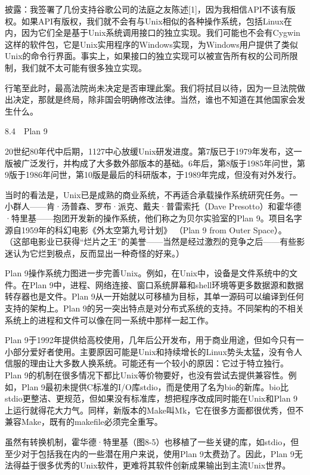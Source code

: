 \documentclass[a4paper,12pt,UTF8,twoside]{ctexbook}
\begin{document}
披露：我签署了几份支持谷歌公司的法庭之友陈述[1]，因为我相信API不该有版权。如果API有版权，我们就不会有与Unix相似的各种操作系统，包括Linux在内，因为它们全是基于Unix系统调用接口的独立实现。我们可能也不会有Cygwin这样的软件包，它是Unix实用程序的Windows实现，为Windows用户提供了类似Unix的命令行界面。事实上，如果接口的独立实现可以被宣告所有权的公司所限制，我们就不太可能有很多独立实现。

行笔至此时，最高法院尚未决定是否审理此案。我们将拭目以待，因为一旦法院做出决定，那就是终局，除非国会明确修改法律。当然，谁也不知道在其他国家会发生什么。





8.4　Plan 9


20世纪80年代中后期，1127中心放缓Unix研发进度。第7版已于1979年发布，这一版被广泛发行，并构成了大多数外部版本的基础。6年后，第8版于1985年问世，第9版于1986年问世，第10版是最后的科研版本，于1989年完成，但没有对外发行。

当时的看法是，Unix已是成熟的商业系统，不再适合承载操作系统研究任务。一小群人——肯·汤普森、罗布·派克、戴夫·普雷索托（Dave Presotto）和霍华德·特里基——抱团开发新的操作系统，他们称之为贝尔实验室的Plan 9。项目名字源自1959年的科幻电影《外太空第九号计划》 （Plan 9 from Outer Space）。 （这部电影业已获得“烂片之王”的美誉——当然是经过激烈的竞争之后——有些影迷认为它烂到极点，反而显出一种奇怪的好来。）

Plan 9操作系统力图进一步完善Unix。例如，在Unix中，设备是文件系统中的文件。在Plan 9中，进程、网络连接、窗口系统屏幕和shell环境等更多数据源和数据转存器也是文件。Plan 9从一开始就以可移植为目标，其单一源码可以编译到任何支持的架构上。Plan 9的另一突出特点是对分布式系统的支持。不同架构的不相关系统上的进程和文件可以像在同一系统中那样一起工作。

Plan 9于1992年提供给高校使用，几年后公开发布，用于商业用途，但如今只有一小部分爱好者使用。主要原因可能是Unix和持续增长的Linux势头太猛，没有令人信服的理由让大多数人换系统。可能还有一个较小的原因：它过于特立独行。Plan 9的机制在很多情况下都比Unix等价物要好，也没有尝试去提供兼容性。例如，Plan 9最初未提供C标准的I/O库stdio，而是使用了名为bio的新库。bio比stdio更整洁、更规范，但如果没有标准库，想把程序改成同时能在Unix和Plan 9上运行就得花大力气。同样，新版本的Make叫Mk，它在很多方面都很优秀，但不兼容Make，既有的makefile必须完全重写。

虽然有转换机制，霍华德·特里基（图8-5）也移植了一些关键的库，如stdio，但至少对于包括我在内的一些潜在用户来说，使用Plan 9太费劲了。因此，Plan 9无法得益于很多优秀的Unix软件，更难将其软件创新成果输出到主流Unix世界。
\end{document}
